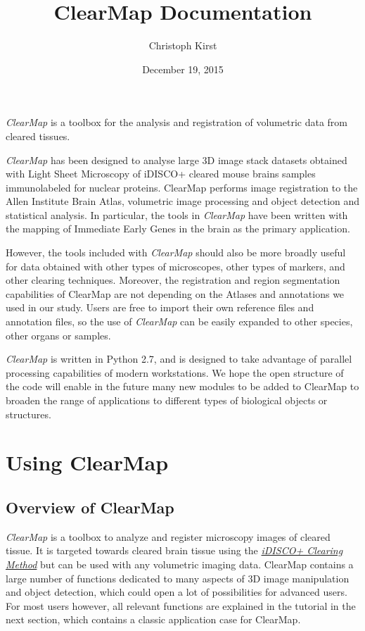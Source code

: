 \documentclass[letterpaper,10pt,english]{sphinxmanual}
\title{ClearMap Documentation}
\date{December 19, 2015}
\author{Christoph Kirst}
\begin{document}
\maketitle
\tableofcontents
{}\label{index::doc}


\emph{ClearMap} is a toolbox for the analysis and registration of volumetric data
from cleared tissues.

\emph{ClearMap} has been designed to analyse large 3D image stack datasets obtained with Light Sheet Microscopy
of iDISCO+ cleared mouse brains samples immunolabeled for nuclear proteins. ClearMap performs image registration to the Allen Institute Brain Atlas, volumetric image processing and object detection and statistical analysis. In particular, the tools in \emph{ClearMap} have been written with the mapping of Immediate Early Genes in the brain as the primary application.

However, the tools included with \emph{ClearMap} should also be more broadly useful for data obtained with other types of microscopes, other types of markers, and other clearing techniques. Moreover, the registration and region segmentation capabilities of ClearMap are not depending on the Atlases and annotations we used in our study. Users are free to import their own reference files and annotation files, so the use of \emph{ClearMap} can be easily expanded to other species, other organs or samples.

\emph{ClearMap} is written in Python 2.7, and is designed to take advantage of parallel processing capabilities of modern workstations. We hope the open structure of the code will enable in the future many new modules to be added to ClearMap to broaden the range of applications to different types of biological objects or structures.


\chapter{Using ClearMap}
\label{index:using-clearmap}\label{index:clearmap}

\section{Overview of ClearMap}
\label{introduction::doc}\label{introduction:overview-of-clearmap}
\emph{ClearMap} is a toolbox to analyze and register microscopy images of cleared
tissue. It is targeted towards cleared brain tissue using the {\hyperref[introduction:idisco-clearing-method]{\emph{iDISCO+ Clearing Method}}}
but can be used with any volumetric imaging data. ClearMap contains a large number of functions dedicated to many aspects of 3D image manipulation and object detection, which could open a lot of possibilities for advanced users. For most users however, all relevant functions are explained in the tutorial in the next section, which contains a classic application case for ClearMap.
\end{document}
